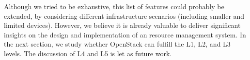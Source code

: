 Although we tried to be exhaustive, this list of features could
probably be extended, \eg by considering different \edge
infrastructure scenarios (\eg including smaller and limited devices).
However, we believe it is already valuable to deliver significant
insights on the design and implementation of an \edge resource management
system. In the next section, we study whether OpenStack can fulfill the L1, L2,
and L3 levels. The discussion of L4 and L5 is let as future work.

